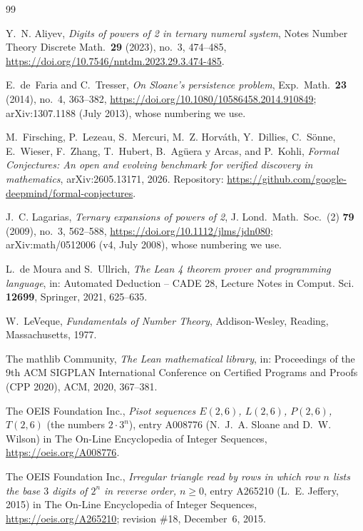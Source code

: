 \documentclass[11pt]{amsart}
\theoremstyle{plain}
\theoremstyle{definition}
\begin{document}
{\small
\begin{thebibliography}{99}

Y.~N. Aliyev, \emph{Digits of powers of 2 in ternary numeral system}, Notes Number Theory Discrete Math.\ \textbf{29} (2023), no.~3, 474--485, \url{https://doi.org/10.7546/nntdm.2023.29.3.474-485}.

E.~de~Faria and C.~Tresser, \emph{On Sloane's persistence problem}, Exp.\ Math.\ \textbf{23} (2014), no.~4, 363--382, \url{https://doi.org/10.1080/10586458.2014.910849}; arXiv:1307.1188 (July 2013), whose numbering we use.

M.~Firsching, P.~Lezeau, S.~Mercuri, M.~Z. Horv\'ath, Y.~Dillies, C.~S\"onne, E.~Wieser, F.~Zhang, T.~Hubert, B.~Ag\"uera y Arcas, and P.~Kohli, \emph{Formal Conjectures: An open and evolving benchmark for verified discovery in mathematics}, arXiv:2605.13171, 2026. Repository: \url{https://github.com/google-deepmind/formal-conjectures}.

J.~C. Lagarias, \emph{Ternary expansions of powers of 2}, J. Lond.\ Math.\ Soc.\ (2) \textbf{79} (2009), no.~3, 562--588, \url{https://doi.org/10.1112/jlms/jdn080}; arXiv:math/0512006 (v4, July 2008), whose numbering we use.

L.~de Moura and S.~Ullrich, \emph{The Lean 4 theorem prover and programming language}, in: Automated Deduction -- CADE 28, Lecture Notes in Comput. Sci. \textbf{12699}, Springer, 2021, 625--635.

W.~LeVeque, \emph{Fundamentals of Number Theory}, Addison-Wesley, Reading, Massachusetts, 1977.

The mathlib Community, \emph{The Lean mathematical library}, in: Proceedings of the 9th ACM SIGPLAN International Conference on Certified Programs and Proofs (CPP 2020), ACM, 2020, 367--381.

The OEIS Foundation Inc., \emph{Pisot sequences $E(2,6)$, $L(2,6)$, $P(2,6)$, $T(2,6)$} (the numbers $2\cdot3^n$), entry A008776 (N.~J.~A. Sloane and D.~W. Wilson) in The On-Line Encyclopedia of Integer Sequences, \url{https://oeis.org/A008776}.

The OEIS Foundation Inc., \emph{Irregular triangle read by rows in which row $n$ lists the base $3$ digits of $2^n$ in reverse order, $n\ge0$}, entry A265210 (L.~E. Jeffery, 2015) in The On-Line Encyclopedia of Integer Sequences, \url{https://oeis.org/A265210}; revision \#18, December~6, 2015.

\end{thebibliography}
}
\end{document}
